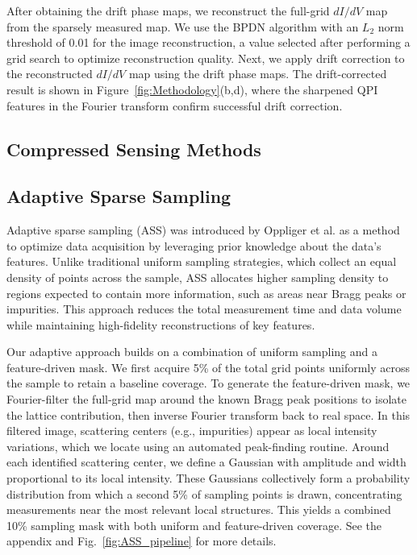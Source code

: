 \documentclass[amsmath,amssymb,superscriptaddress,longbibliography,prb,twocolumn,floatfix]{revtex4-2}
\newif\ifptitle
\newif\ifpnumber
\newcounter{para}
\newcommand\ptitle[1]{\par\refstepcounter{para}
{\ifpnumber{\noindent\textcolor{lightgray}{\textbf{\thepara}}\indent}\fi}
{\ifptitle{\textbf{[{#1}]}}\fi}}
\begin{document}
\ptitle{Reconstructing the sparsely measured map and applying drift correction}

After obtaining the drift phase maps, we reconstruct the full-grid \(dI/dV\) map from the sparsely measured map. We use the BPDN algorithm with an \(L_2\) norm threshold of 0.01 for the image reconstruction, a value selected after performing a grid search to optimize reconstruction quality. Next, we apply drift correction to the reconstructed \(dI/dV\) map using the drift phase maps. The drift-corrected result is shown in Figure~\ref{fig:Methodology}(b,d), where the sharpened QPI features in the Fourier transform confirm successful drift correction.

\subsection{Compressed Sensing Methods}

\subsection{Adaptive Sparse Sampling}

\ptitle{Introduction and Rationale to ASS}

Adaptive sparse sampling (ASS) was introduced by Oppliger et al.\cite{OppligerMethodsX2022} as a method to optimize data acquisition by leveraging prior knowledge about the data's features. Unlike traditional uniform sampling strategies, which collect an equal density of points across the sample, ASS allocates higher sampling density to regions expected to contain more information, such as areas near Bragg peaks or impurities. This approach reduces the total measurement time and data volume while maintaining high-fidelity reconstructions of key features.

\ptitle{Implementation of Adaptive Sampling}
Our adaptive approach builds on a combination of uniform sampling and a feature-driven mask. We first acquire 5\% of the total grid points uniformly across the sample to retain a baseline coverage. To generate the feature-driven mask, we Fourier-filter the full-grid map around the known Bragg peak positions to isolate the lattice contribution, then inverse Fourier transform back to real space. In this filtered image, scattering centers (e.g., impurities) appear as local intensity variations, which we locate using an automated peak-finding routine. Around each identified scattering center, we define a Gaussian with amplitude and width proportional to its local intensity. These Gaussians collectively form a probability distribution from which a second 5\% of sampling points is drawn, concentrating measurements near the most relevant local structures. This yields a combined
10\% sampling mask with both uniform and feature-driven coverage. See the appendix and Fig.~\ref{fig:ASS_pipeline} for more details.
\end{document}
